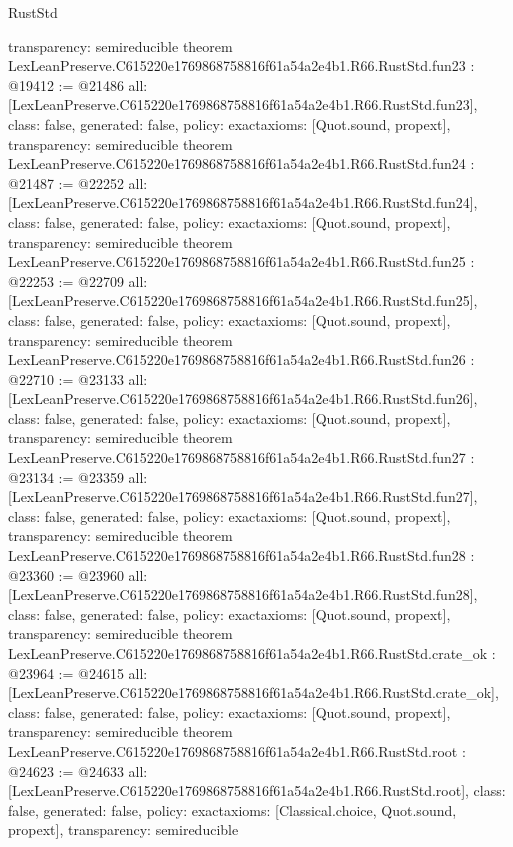 \begin{lexlean}{RustStd}
\begin{coremodule}
{  transparency: semireducible
}
theorem LexLeanPreserve.C615220e1769868758816f61a54a2e4b1.R66.RustStd.fun23 : @19412 := @21486 {
  all: [LexLeanPreserve.C615220e1769868758816f61a54a2e4b1.R66.RustStd.fun23],
  class: false,
  generated: false,
  policy: exact{axioms: [Quot.sound, propext]},
  transparency: semireducible
}
theorem LexLeanPreserve.C615220e1769868758816f61a54a2e4b1.R66.RustStd.fun24 : @21487 := @22252 {
  all: [LexLeanPreserve.C615220e1769868758816f61a54a2e4b1.R66.RustStd.fun24],
  class: false,
  generated: false,
  policy: exact{axioms: [Quot.sound, propext]},
  transparency: semireducible
}
theorem LexLeanPreserve.C615220e1769868758816f61a54a2e4b1.R66.RustStd.fun25 : @22253 := @22709 {
  all: [LexLeanPreserve.C615220e1769868758816f61a54a2e4b1.R66.RustStd.fun25],
  class: false,
  generated: false,
  policy: exact{axioms: [Quot.sound, propext]},
  transparency: semireducible
}
theorem LexLeanPreserve.C615220e1769868758816f61a54a2e4b1.R66.RustStd.fun26 : @22710 := @23133 {
  all: [LexLeanPreserve.C615220e1769868758816f61a54a2e4b1.R66.RustStd.fun26],
  class: false,
  generated: false,
  policy: exact{axioms: [Quot.sound, propext]},
  transparency: semireducible
}
theorem LexLeanPreserve.C615220e1769868758816f61a54a2e4b1.R66.RustStd.fun27 : @23134 := @23359 {
  all: [LexLeanPreserve.C615220e1769868758816f61a54a2e4b1.R66.RustStd.fun27],
  class: false,
  generated: false,
  policy: exact{axioms: [Quot.sound, propext]},
  transparency: semireducible
}
theorem LexLeanPreserve.C615220e1769868758816f61a54a2e4b1.R66.RustStd.fun28 : @23360 := @23960 {
  all: [LexLeanPreserve.C615220e1769868758816f61a54a2e4b1.R66.RustStd.fun28],
  class: false,
  generated: false,
  policy: exact{axioms: [Quot.sound, propext]},
  transparency: semireducible
}
theorem LexLeanPreserve.C615220e1769868758816f61a54a2e4b1.R66.RustStd.crate_ok : @23964 := @24615 {
  all: [LexLeanPreserve.C615220e1769868758816f61a54a2e4b1.R66.RustStd.crate_ok],
  class: false,
  generated: false,
  policy: exact{axioms: [Quot.sound, propext]},
  transparency: semireducible
}
theorem LexLeanPreserve.C615220e1769868758816f61a54a2e4b1.R66.RustStd.root : @24623 := @24633 {
  all: [LexLeanPreserve.C615220e1769868758816f61a54a2e4b1.R66.RustStd.root],
  class: false,
  generated: false,
  policy: exact{axioms: [Classical.choice, Quot.sound, propext]},
  transparency: semireducible
}


\end{coremodule}
\end{lexlean}

